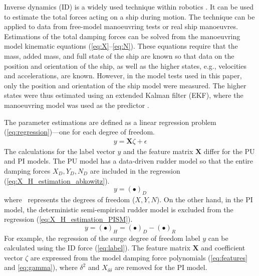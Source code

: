 Inverse dynamics (ID) is a widely used technique within robotics \citep{faber_inverse_2018, haningerNonparametricInverseDynamic2019, mastalliInverseDynamicsMPCNullspace2023, sunHighorderInverseDynamics2023, kurtzInverseDynamicsTrajectory2023}. It can be used to estimate the total forces acting on a ship during motion. The technique can be applied to data from free-model manoeuvring tests or real ship manoeuvres. 
Estimations of the total damping forces can be solved from the manoeuvring model kinematic equations  (\autoref{eq:X}--\autoref{eq:N}). These equations require that the mass, added mass, and full state of the ship are known so that data on the position and orientation of the ship, as well as the higher states, e.g., velocities and accelerations, are known.
However, in the model tests used in this paper, only the position and orientation of the ship model were measured.
The higher states were thus estimated using an extended Kalman filter (EKF), where the manoeuvring model was used as the predictor \citep{alexandersson_system_2022}.

The parameter estimations are defined as a linear regression problem (\autoref{eq:regression})---one for each degree of freedom. 
\begin{equation}\label{eq:regression}
\begin{split}y = \mathbf{X}\zeta + \epsilon\end{split}
\end{equation}
The calculations for the label vector \(y\) and the feature matrix \(\textbf{X}\) differ for the PU and PI models. The PU model has a data-driven rudder model so that the entire damping forces $X_D,Y_D,N_D$ are included in the regression (\autoref{eq:X_H_estimation_abkowitz}). 
\begin{equation}
    \label{eq:X_H_estimation_abkowitz}
    y = (\bullet)_D
\end{equation}
where \textbullet\ represents the degrees of freedom ($X,Y,N$).
On the other hand, in the PI model, the deterministic semi-empirical rudder model is excluded from the regression (\autoref{eq:X_H_estimation_PISM}). 
\begin{equation}
    \label{eq:X_H_estimation_PISM}
    y = (\bullet)_H = (\bullet)_D - (\bullet)_R
\end{equation}
For example, the regression of the surge degree of freedom label \(y\) can be calculated using the ID force (\autoref{eq:label}). 
The feature matrix \(\textbf{X}\) and coefficient vector $\zeta$ are expressed from the model damping force polynomials (\autoref{eq:features} and \autoref{eq:gamma}), where $\delta^2$ and $X_{\delta\delta}$ are removed for the PI model.

